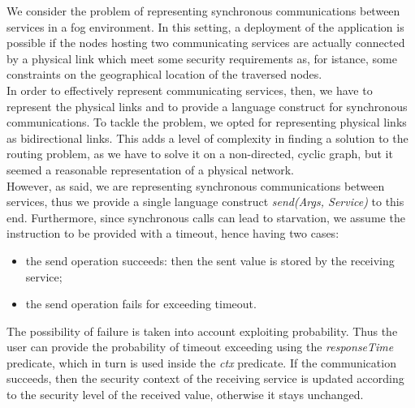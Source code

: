 \documentclass[../DraftNotes.tex]{subfiles}
\begin{document}
We consider the problem of representing synchronous communications between services in a fog environment. In this setting, a deployment of the application is possible if the nodes hosting two communicating services are actually connected by a physical link which meet some security requirements as, for istance, some constraints on the geographical location of the traversed nodes. \\
In order to effectively represent communicating services, then, we have to represent the physical links and to provide a language construct for synchronous communications.
\smallskip
To tackle the problem, we opted for representing physical links as bidirectional links. This adds a level of complexity in finding a solution to the routing problem, as we have to solve it on a non-directed, cyclic graph, but it seemed a reasonable representation of a physical network. \\
However, as said, we are representing synchronous communications between services, thus we provide a single language construct \emph{send(Args, Service)} to this end. Furthermore, since synchronous calls can lead to starvation, we assume the instruction to be provided with a timeout, hence having two cases:
\begin{itemize}
	\item the send operation succeeds: then the sent value is stored by the receiving service;
	\item the send operation fails for exceeding timeout.
\end{itemize}
The possibility of failure is taken into account exploiting probability. Thus the user can provide the probability of timeout exceeding using the \emph{responseTime} predicate, which in turn is used inside the \emph{ctx} predicate. If the communication succeeds, then the security context of the receiving service is updated according to the security level of the received value, otherwise it stays unchanged. 
\end{document}
